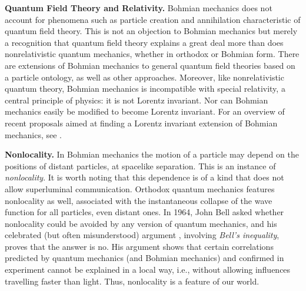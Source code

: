 \documentclass[12pt]{report}
\begin{document}
\noindent\textbf{Quantum Field Theory and Relativity.}
Bohmian mechanics does not account for phenomena such as particle  
creation and annihilation characteristic of quantum field theory.  
This is not an objection to Bohmian mechanics but merely a  
recognition that quantum field theory explains a great deal more than  
does nonrelativistic quantum mechanics, whether in orthodox or  
Bohmian form. There are extensions  of Bohmian mechanics to general  
quantum field theories based on a particle ontology, as well as
other approaches.
Moreover, like nonrelativistic quantum theory, Bohmian mechanics is  
incompatible with special relativity, a central principle of physics:  
it is not Lorentz invariant. Nor can Bohmian mechanics easily be  
modified to become Lorentz invariant. For an overview of recent proposals aimed at  
finding a Lorentz invariant extension of Bohmian mechanics, see \cite{Tum06b}.


\bigskip

\noindent\textbf{Nonlocality.} 
In Bohmian mechanics the motion of a particle may depend on the positions of distant particles, at spacelike separation. This is an instance of \emph{nonlocality}. It is worth noting that this dependence is of a kind that does not allow superluminal communication. Orthodox quantum mechanics features nonlocality as well, associated with the instantaneous collapse of the wave function for all particles, even distant ones. In 1964, John Bell asked whether nonlocality could be avoided by any version of quantum mechanics, and his celebrated (but often misunderstood) argument \cite{Bell64,Bell87b}, involving \emph{Bell's inequality}, proves that the answer is no. His argument shows that certain correlations predicted by quantum mechanics (and Bohmian mechanics) and confirmed in experiment \cite{Aspect1982} cannot be explained in a local way, i.e., without allowing influences travelling faster than light. Thus, nonlocality is a feature of our world.%
\end{document}
